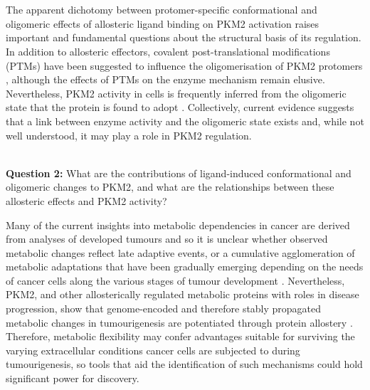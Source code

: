 %
%
\\\\
%
%
The apparent dichotomy between protomer-specific conformational and oligomeric effects of allosteric ligand binding on PKM2 activation raises important and fundamental questions about the structural basis of its regulation. In addition to allosteric effectors, covalent post-translational modifications (PTMs) have been suggested to influence the oligomerisation of PKM2 protomers \cite{Anastasiou:2011aa,Christofk:2008aa}, although the effects of PTMs on the enzyme mechanism remain elusive. Nevertheless, PKM2 activity in cells is frequently inferred from the oligomeric state that the protein is found to adopt \cite{Wang:2017ab,Wang:2017aa,Qi:2017aa,Lim:2016aa,Hitosugi:2009aa,Christofk:2008ab,Anastasiou:2012aa,Anastasiou:2011aa}. Collectively, current evidence suggests that a link between enzyme activity and the oligomeric state exists and, while not well understood, it may play a role in PKM2 regulation. 
%
%
\\\\
%
%
\begin{tcolorbox}
\textbf{Question 2:} What are the contributions of ligand-induced conformational and oligomeric changes to PKM2, and what are the relationships between these allosteric effects and PKM2 activity?	
\end{tcolorbox}
%
%
Many of the current insights into metabolic dependencies in cancer are derived from analyses of developed tumours and so it is unclear whether observed metabolic changes reflect late adaptive events, or a cumulative agglomeration of metabolic adaptations that have been gradually emerging depending on the needs of cancer cells along the various stages of tumour development \cite{Macpherson:2017aa}. Nevertheless, PKM2, and other allosterically regulated metabolic proteins with roles in disease progression, show that genome-encoded and therefore stably propagated metabolic changes in tumourigenesis are potentiated through protein allostery \cite{Macpherson:2017aa}. Therefore, metabolic flexibility may confer advantages suitable for surviving the varying extracellular conditions cancer cells are subjected to during tumourigenesis, so tools that aid the identification of such mechanisms could hold significant power for discovery.


\clearpage


